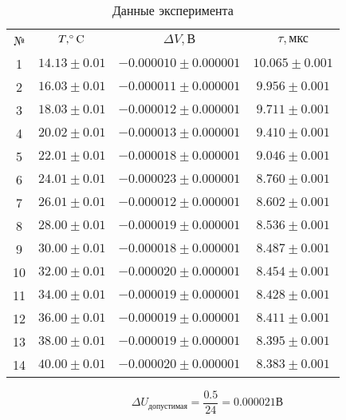 \documentclass[a4paper]{article}
\begin{document}
\begin{table}[h]
    \centering
        \begin{tabular}{|c|c|c|c|}
        \cline{1-4}
        № & $T, \celsius$ & $\Delta V, \text{В}$ & $\tau, \text{мкс}$\\ \cline{1-4}
        1 & $14.13 \pm 0.01$ & $-0.000010 \pm 0.000001$& $10.065 \pm 0.001$\\ \cline{1-4}
        2 & $16.03 \pm 0.01$& $-0.000011 \pm 0.000001$ & $9.956 \pm 0.001$\\ \cline{1-4}
        3 & $18.03 \pm 0.01$& $-0.000012 \pm 0.000001$ & $9.711 \pm 0.001$\\ \cline{1-4}
        4 & $20.02 \pm 0.01$& $-0.000013 \pm 0.000001$ & $9.410 \pm 0.001$\\ \cline{1-4}
        5 & $22.01 \pm 0.01$& $-0.000018 \pm 0.000001$ & $9.046 \pm 0.001$\\ \cline{1-4}
        6 & $24.01 \pm 0.01$& $-0.000023 \pm 0.000001$ & $8.760 \pm 0.001$\\ \cline{1-4}
        7 & $26.01 \pm 0.01$& $-0.000012 \pm 0.000001$ & $8.602 \pm 0.001$\\ \cline{1-4}
        8 & $28.00 \pm 0.01$& $-0.000019 \pm 0.000001$ & $8.536 \pm 0.001$\\ \cline{1-4}
        9 & $30.00 \pm 0.01$& $-0.000018 \pm 0.000001$ & $8.487 \pm 0.001$\\ \cline{1-4}
        10 & $32.00 \pm 0.01$& $-0.000020 \pm 0.000001$ & $8.454 \pm 0.001$\\ \cline{1-4}
        11 & $34.00 \pm 0.01$& $-0.000019 \pm 0.000001$ & $8.428 \pm 0.001$\\ \cline{1-4}
        12 & $36.00 \pm 0.01$& $-0.000019 \pm 0.000001$ & $8.411 \pm 0.001$\\ \cline{1-4}
        13 & $38.00 \pm 0.01$& $-0.000019 \pm 0.000001$ & $8.395 \pm 0.001$\\ \cline{1-4}
        14 & $40.00 \pm 0.01$& $-0.000020 \pm 0.000001$ & $8.383 \pm 0.001$\\ \cline{1-4}
        
        \end{tabular}
        \caption{Данные эксперимента}
        \label{tab:my_label}
    \end{table}

\begin{equation}
    \Delta U_{\text{допустимая}} = \frac{0.5}{24} = 0.000021 \text{В}
\end{equation}
\end{document}

